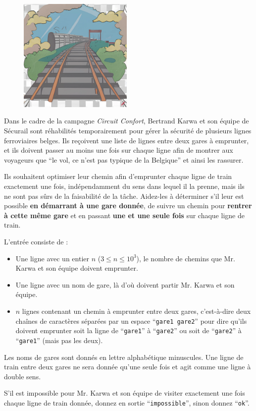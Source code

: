 \problemname{\problemyamlname}

\begin{figure}
	\centering
	\includegraphics[width=5.5cm]{railway.jpg}
\end{figure}
Dans le cadre de la campagne \emph{Circuit Confort}, Bertrand Karwa et son équipe de Sécurail sont réhabilités
temporairement pour gérer la sécurité de plusieurs lignes ferroviaires belges. Ils reçoivent une liste de lignes
entre deux gares à emprunter, et ils doivent passer au moins une fois sur chaque ligne afin de montrer aux
voyageurs que ``le vol, ce n'est pas typique de la Belgique'' et ainsi les rassurer.

Ils souhaitent optimiser leur chemin afin d'emprunter chaque ligne de train exactement une fois, indépendamment du sens dans lequel il la prenne, mais ils ne sont pas sûrs
de la faisabilité de la tâche. Aidez-les à déterminer s'il leur est possible \textbf{en démarrant à une gare donnée}, de suivre un chemin pour \textbf{rentrer à cette même gare} et en passant \textbf{une et une seule fois} sur chaque ligne de train.

\begin{Input}
	L'entrée consiste de :
	\begin{itemize}
		\item Une ligne avec un entier $n$ ($3 \le n \le 10^3$), le nombre de chemins que Mr. Karwa et son équipe doivent emprunter.
		\item Une ligne avec un nom de gare, là d'où doivent partir Mr. Karwa et son équipe.
		\item $n$ lignes contenant un chemin à emprunter entre deux gares, c'est-à-dire deux chaînes de caractères séparées par un espace ``\verb|gare1 gare2|'' pour dire qu'ils doivent emprunter soit la ligne de ``\verb|gare1|'' à ``\verb|gare2|'' ou soit de ``\verb|gare2|'' à ``\verb|gare1|'' (mais pas les deux).
	\end{itemize}
	Les noms de gares sont donnés en lettre alphabétique minuscules.
	Une ligne de train entre deux gares ne sera donnée qu'une seule fois et agit comme une ligne à double sens.
\end{Input}

\begin{Output}
	S'il est impossible pour Mr. Karwa et son équipe de visiter exactement une fois chaque ligne de train donnée, donnez en sortie ``\verb|impossible|'', sinon donnez ``\verb|ok|''.
\end{Output}
